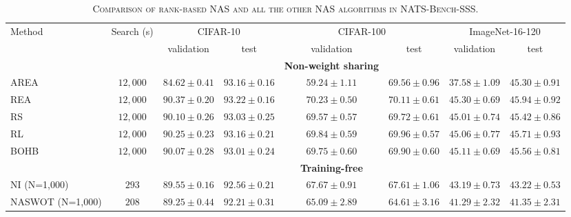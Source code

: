 \documentclass[sigconf]{acmart}
\begin{document}
    \begin{table*}[htb]
        \newcommand{\z}{\phantom{0}}
        \caption{\textsc{Comparison of rank-based NAS and all the other NAS algorithms in NATS-Bench-SSS.}}
          \vspace{-\baselineskip}
        \begin{tabular}{@{}lccccccc@{}}\toprule
        Method & Search (s) & \multicolumn{2}{c}{CIFAR-10} & \multicolumn{2}{c}{CIFAR-100} & \multicolumn{2}{c}{ImageNet-16-120} \\ \cmidrule(lr){3-4}\cmidrule(lr){5-6}\cmidrule(lr){7-8}
                             &          & validation       & test             & validation       & test              & validation       & test \\ \midrule
                             &          &                  &                  & \textbf{Non-weight sharing} &        &                  &                  \\
        AREA                 & $12,000$ & $84.62 \pm 0.41$ & $93.16 \pm 0.16$ & $59.24 \pm 1.11$ & $69.56 \pm 0.96$  & $37.58 \pm 1.09$ & $45.30 \pm 0.91$ \\
        REA                  & $12,000$ & $90.37 \pm 0.20$ & $93.22 \pm 0.16$ & $70.23 \pm 0.50$ & $70.11 \pm 0.61$  & $45.30 \pm 0.69$ & $45.94 \pm 0.92$ \\
        RS                   & $12,000$ & $90.10 \pm 0.26$ & $93.03 \pm 0.25$ & $69.57 \pm 0.57$ & $69.72 \pm 0.61$  & $45.01 \pm 0.74$ & $45.42 \pm 0.86$ \\
        RL                   & $12,000$ & $90.25 \pm 0.23$ & $93.16 \pm 0.21$ & $69.84 \pm 0.59$ & $69.96 \pm 0.57$  & $45.06 \pm 0.77$ & $45.71 \pm 0.93$ \\
        BOHB                 & $12,000$ & $90.07 \pm 0.28$ & $93.01 \pm 0.24$ & $69.75 \pm 0.60$ & $69.90 \pm 0.60$  & $45.11 \pm 0.69$ & $45.56 \pm 0.81$ \\ \midrule
                             &          &                  &                  & \textbf{Training-free} &             &                  &                  \\
        NI (N=1,000)         & $293$    & $89.55 \pm 0.16$ & $92.56 \pm 0.21$ & $67.67 \pm 0.91$ & $67.61 \pm 1.06$  & $43.19 \pm 0.73$ & $43.22 \pm 0.53$ \\ 
        NASWOT (N=1,000)     & $208$    & $89.25 \pm 0.44$ & $92.21 \pm 0.31$ & $65.09 \pm 2.89$ & $64.61 \pm 3.16$  & $41.29 \pm 2.32$ & $41.35 \pm 2.31$ \\ 

\end{tabular}
\end{table*}
\end{document}
